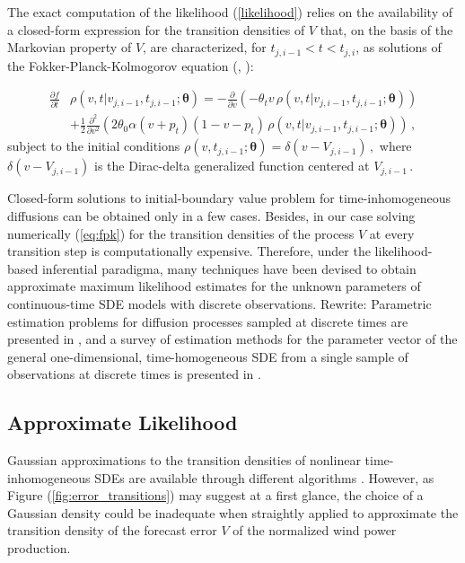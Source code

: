 \documentclass[11pt]{article}
\theoremstyle{definition}
\begin{document}
The exact computation of the likelihood (\ref{likelihood}) relies on the availability of a closed-form expression for the transition densities of $V$ that, on the basis of the Markovian property of $V$, are characterized, for $ t_{j, i-1} < t < t_{j,i}$,  as solutions of the Fokker-Planck-Kolmogorov equation (\cite[36]{iacus1}, \cite[61-68]{saso}):

\begin{align}
\frac{ \partial f }{\partial t } & \rho(v ,t \vert v_{j,i-1} ,  t_{j,i-1} ; \bm{\theta} )= - \frac{\partial}{ \partial v} (- \theta_t v \, \rho(v ,t \vert v_{j,i-1} ,  t_{j,i-1} ; \bm{\theta} ) ) \nonumber \\
& + \frac{1}{2} \frac{\partial^2}{ \partial v^2} ( 2 \theta_0 \alpha (v+ p_t) (1 - v- p_t) \, \rho(v ,t \vert v_{j,i-1} ,  t_{j,i-1} ; \bm{\theta} ) )\,,  \label{eq:fpk}
\end{align}
subject to the initial conditions $\rho(v , t_{j, i-1} ; \bm{\theta} ) = \delta(v - V_{j, i-1}) \,,$ where $ \delta(v - V_{j, i-1})$ is the Dirac-delta generalized function centered at $ V_{j, i-1}\,.$

Closed-form solutions to initial-boundary value problem for time-in\-ho\-mo\-geneous diffusions can be obtained only in a few cases. Besides, in our case solving numerically (\ref{eq:fpk}) for the transition densities of the process $V$ at every transition step is computationally expensive. 
Therefore, under the likelihood-based inferential paradigma, many techniques have been devised to obtain approximate maximum likelihood estimates for the unknown parameters of continuous-time SDE models with discrete observations. 
 {\color{red} Rewrite: Parametric estimation problems for diffusion processes sampled at discrete times are presented in \autocite[Chapter 3]{iacus1}, and a survey of estimation methods for the parameter vector of the general one-dimensional, time-homogeneous SDE from a single sample of observations at discrete times is presented in \autocite{hurn}.}

\subsection{Approximate Likelihood}

Gaussian approximations to the transition densities of nonlinear time-in\-ho\-mo\-geneous SDEs are available through different algorithms  \autocite[Chapter 9]{saso}. However, as Figure (\ref{fig:error_transitions}) may suggest at a first glance, the choice of a Gaussian density could be inadequate when straightly applied to approximate the transition density of the forecast error $V$ of the normalized wind power production. 
\end{document}
